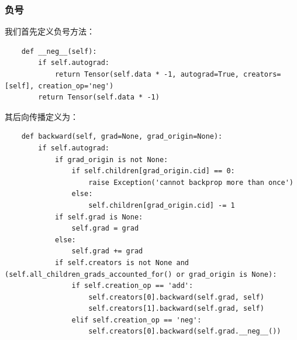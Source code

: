 \subsubsection{负号}
我们首先定义负号方法：
\begin{lstlisting}
    def __neg__(self):
        if self.autograd:
            return Tensor(self.data * -1, autograd=True, creators=[self], creation_op='neg')
        return Tensor(self.data * -1)
\end{lstlisting}
其后向传播定义为：
\begin{lstlisting}
    def backward(self, grad=None, grad_origin=None):
        if self.autograd:
            if grad_origin is not None:
                if self.children[grad_origin.cid] == 0:
                    raise Exception('cannot backprop more than once')
                else:
                    self.children[grad_origin.cid] -= 1
            if self.grad is None:
                self.grad = grad
            else:
                self.grad += grad
            if self.creators is not None and (self.all_children_grads_accounted_for() or grad_origin is None):
                if self.creation_op == 'add':
                    self.creators[0].backward(self.grad, self)
                    self.creators[1].backward(self.grad, self)
                elif self.creation_op == 'neg':
                    self.creators[0].backward(self.grad.__neg__())
\end{lstlisting}


